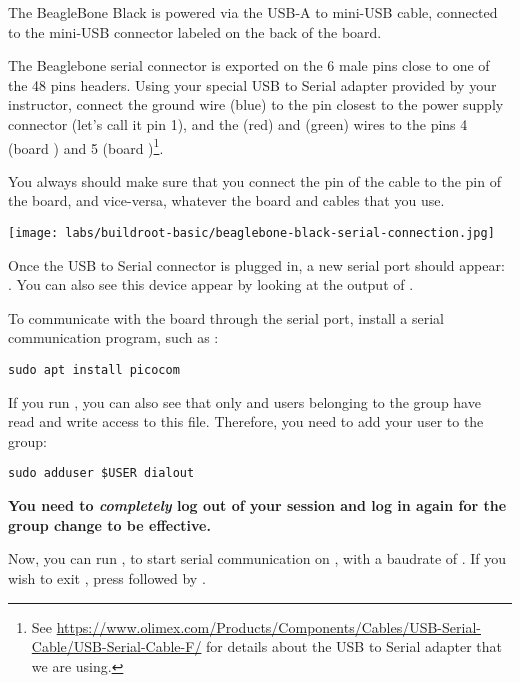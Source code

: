 The BeagleBone Black is powered via the USB-A to mini-USB cable,
connected to the mini-USB connector labeled  on the back of
the board.

The Beaglebone serial connector is exported on the 6 male pins close
to one of the 48 pins headers. Using your special USB to Serial
adapter provided by your instructor, connect the ground wire (blue) to
the pin closest to the power supply connector (let's call it pin 1),
and the  (red) and  (green) wires to the pins 4
(board ) and 5 (board )\footnote{See
  \url{https://www.olimex.com/Products/Components/Cables/USB-Serial-Cable/USB-Serial-Cable-F/}
  for details about the USB to Serial adapter that we are using.}.

You always should make sure that you connect the  pin of the
cable to the  pin of the board, and vice-versa, whatever the
board and cables that you use.

\begin{center}
\texttt{[image: labs/buildroot-basic/beaglebone-black-serial-connection.jpg]}
\end{center}

Once the USB to Serial connector is plugged in, a new serial port
should appear: .  You can also see this device
appear by looking at the output of .

To communicate with the board through the serial port, install a
serial communication program, such as :

\begin{verbatim}
sudo apt install picocom
\end{verbatim}

If you run , you can also see that only
 and users belonging to the  group have read
and write access to this file. Therefore, you need to add your user to
the  group:

\begin{verbatim}
sudo adduser $USER dialout
\end{verbatim}

{\bf You need to {\em completely} log out of your session and log in again
for the group change to be effective.}

Now, you can run , to start
serial communication on , with a baudrate of
. If you wish to exit , press
\code{[Ctrl][a]} followed by \code{[Ctrl][x]}.

